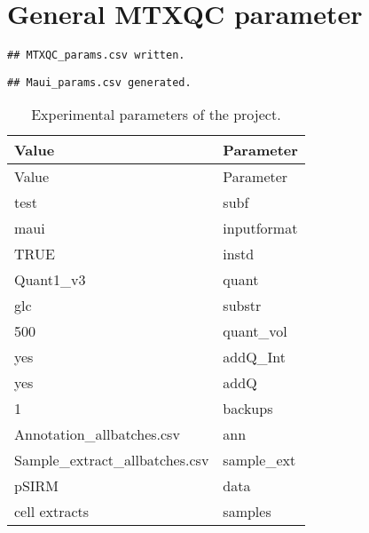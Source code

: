 \documentclass[10pt,]{article}
\begin{document}
\section{General MTXQC parameter}\label{general-mtxqc-parameter}

\begin{verbatim}
## MTXQC_params.csv written.
\end{verbatim}

\begin{verbatim}
## Maui_params.csv generated.
\end{verbatim}

\begin{longtable}[]{@{}ll@{}}
\caption{Experimental parameters of the project.}\tabularnewline
\toprule
Value & Parameter\tabularnewline
\midrule
\endfirsthead
\toprule
Value & Parameter\tabularnewline
\midrule
\endhead
test & subf\tabularnewline
maui & inputformat\tabularnewline
TRUE & instd\tabularnewline
Quant1\_v3 & quant\tabularnewline
glc & substr\tabularnewline
500 & quant\_vol\tabularnewline
yes & addQ\_Int\tabularnewline
yes & addQ\tabularnewline
1 & backups\tabularnewline
Annotation\_allbatches.csv & ann\tabularnewline
Sample\_extract\_allbatches.csv & sample\_ext\tabularnewline
pSIRM & data\tabularnewline
cell extracts & samples\tabularnewline
\bottomrule
\end{longtable}
\newpage
\singlespacing 
\end{document}
